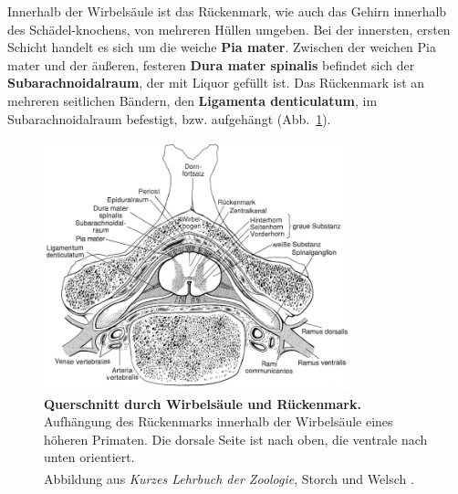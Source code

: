 \noindent Innerhalb der Wirbelsäule ist das Rückenmark, wie auch das Gehirn innerhalb des Schädel-knochens, von mehreren Hüllen umgeben. Bei der innersten, ersten Schicht handelt es sich um die weiche \textbf{Pia mater}. Zwischen der weichen Pia mater und der äußeren, festeren \textbf{Dura mater spinalis} befindet sich der \textbf{Subarachnoidalraum}, der mit Liquor gefüllt ist. Das Rückenmark ist an mehreren seitlichen Bändern, den \textbf{Ligamenta denticulatum}, im Subarachnoidalraum befestigt, bzw. aufgehängt (Abb.~\ref{fig:ruckenmark_wirbelsaeule}). 

\begin{figure}[H]
     \centering
     \includegraphics[width=0.79\textwidth]{pictures/Bilder_Jule/Andere/rueckenmark_wirbelsaeule.png}
     \caption[Querschnitt durch Wirbelsäule und Rückenmark]{\textbf{Querschnitt durch Wirbelsäule und Rückenmark.} Aufhängung des Rückenmarks innerhalb der Wirbelsäule eines höheren Primaten. Die dorsale Seite ist nach oben, die ventrale nach unten orientiert.\\
     Abbildung aus \textit{Kurzes Lehrbuch der Zoologie}, Storch und Welsch \textsuperscript{\cite[Kap.~6]{storch2012lehrbuchzoo}}.}
     \label{fig:ruckenmark_wirbelsaeule}
\end{figure}
